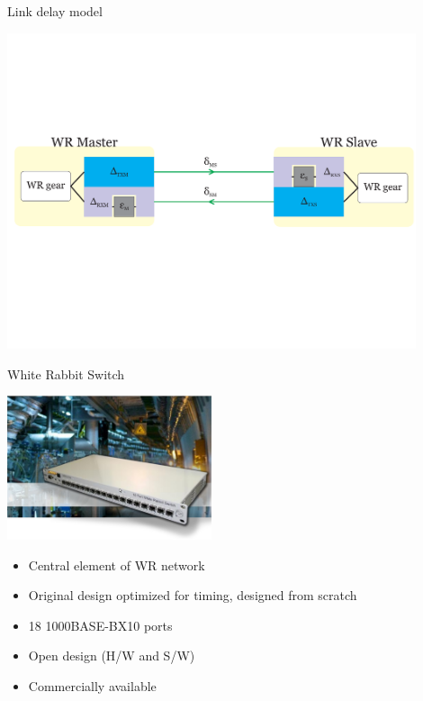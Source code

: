 \documentclass[compress, red]{beamer}
\begin{document}
\begin{frame}{Link delay model}
 \begin{center}
   \includegraphics[width=0.9\textwidth]{protocol/link-model.pdf}
   \end{center}
\end{frame}

\begin{frame}{White Rabbit Switch}

    \begin{center}
     \includegraphics[width=6.0cm]{switch/wrSwitchV3.jpg}
    \end{center}
	\begin{itemize}
	\item Central element of WR network
	\item Original design optimized for timing, designed from scratch
	\item 18 1000BASE-BX10 ports
	\item Open design (H/W and S/W) 
	\item Commercially available
	\end{itemize}
\end{frame}
\end{document}
